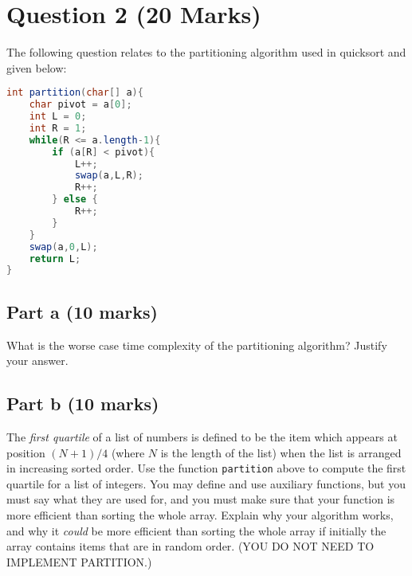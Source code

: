 \documentclass[twoside=false,DIV=14]{scrartcl}
\begin{document}
\vspace{2em}


\section*{Question 2 (20 Marks)}
The following question relates to the partitioning algorithm used in quicksort and given below:
\begin{lstlisting}[language=java]
int partition(char[] a){
    char pivot = a[0];
    int L = 0;
    int R = 1;
    while(R <= a.length-1){
        if (a[R] < pivot){
            L++;
            swap(a,L,R);
            R++;
        } else {
            R++;
        }
    }
    swap(a,0,L);
    return L;
}
\end{lstlisting}

\subsection*{Part a (10 marks)}
What is the worse case time complexity of the partitioning algorithm? Justify your answer.

\subsection*{Part b (10 marks)}
The \emph{first quartile} of a list of numbers is defined to be the item which appears at position $(N + 1)/4$ (where $N$ is the length of the list) when the list is arranged in increasing sorted order.  Use the function \lstinline|partition| above to compute the first quartile for a list of integers.  You may define and use auxiliary functions, but you must say what they are used for, and you must make sure that your function is more efficient than sorting the whole array. Explain why your algorithm works, and why it \emph{could} be more efficient than sorting the whole array if initially the array contains items that are in random order. (YOU DO NOT NEED TO IMPLEMENT PARTITION.)
\end{document}
